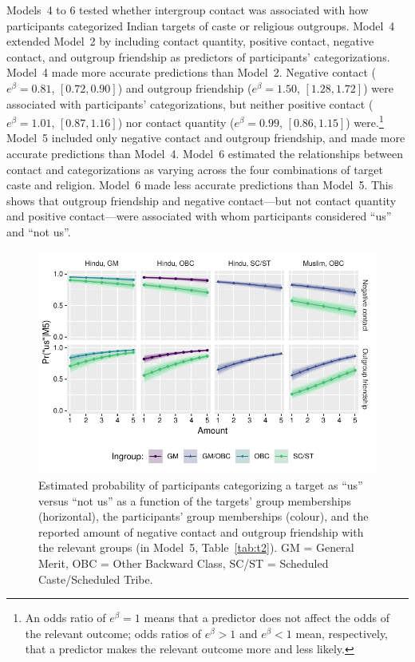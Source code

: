 \documentclass[12pt, a4paper]{article}
\begin{document}
Models~4 to 6 tested whether intergroup contact was associated with how participants categorized Indian targets of caste or religious outgroups. Model~4 extended Model~2 by including contact quantity, positive contact, negative contact, and outgroup friendship as predictors of participants’ categorizations. Model~4 made more accurate predictions than Model~2. Negative contact ($e^\beta = 0.81$, $[0.72, 0.90]$) and outgroup friendship ($e^\beta = 1.50$, $[1.28, 1.72]$) were associated with participants' categorizations, but neither positive contact ($e^\beta = 1.01$, $[0.87, 1.16]$) nor contact quantity ($e^\beta = 0.99$, $[0.86, 1.15]$) were.\footnote{An odds ratio of $e^\beta = 1$ means that a predictor does not affect the odds of the relevant outcome; odds ratios of $e^\beta > 1$ and $e^\beta < 1$ mean, respectively, that a predictor makes the relevant outcome more and less likely.} Model~5 included only negative contact and outgroup friendship, and made more accurate predictions than Model~4. Model~6 estimated the relationships between contact and categorizations as varying across the four combinations of target caste and religion. Model~6 made less accurate predictions than Model~5. This shows that outgroup friendship and negative contact---but not contact quantity and positive contact---were associated with whom participants considered ``us'' and ``not us''.

\begin{figure}
\centering
\includegraphics[scale=1]{../figures/figure-4}
\caption{Estimated probability of participants categorizing a target as ``us'' versus ``not us'' as a function of the targets' group memberships (horizontal), the participants' group memberships (colour), and the reported amount of negative contact and outgroup friendship with the relevant groups (in Model~5, Table~\ref{tab:t2}). GM = General Merit, OBC = Other Backward Class, SC/ST = Scheduled Caste/Scheduled Tribe.}
\label{fig:f4}
\end{figure}
\end{document}

